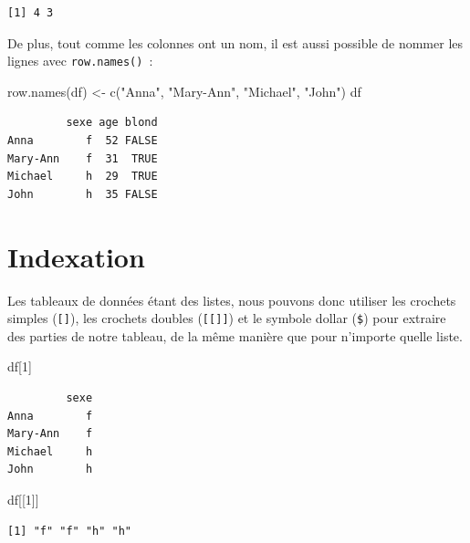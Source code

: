 \documentclass[
  letterpaper,
  DIV=11,
  numbers=noendperiod,
  oneside]{scrreprt}
\newenvironment{Shaded}{\begin{snugshade}}{\end{snugshade}}
\newcommand{\DecValTok}[1]{\textcolor[rgb]{0.68,0.00,0.00}{#1}}
\newcommand{\FunctionTok}[1]{\textcolor[rgb]{0.28,0.35,0.67}{#1}}
\newcommand{\NormalTok}[1]{\textcolor[rgb]{0.00,0.23,0.31}{#1}}
\newcommand{\OtherTok}[1]{\textcolor[rgb]{0.00,0.23,0.31}{#1}}
\newcommand{\StringTok}[1]{\textcolor[rgb]{0.13,0.47,0.30}{#1}}
\begin{document}
\begin{verbatim}
[1] 4 3
\end{verbatim}

De plus, tout comme les colonnes ont un nom, il est aussi possible de
nommer les lignes avec \texttt{row.names()}~:

\begin{Shaded}
\begin{Highlighting}[]
\FunctionTok{row.names}\NormalTok{(df) }\OtherTok{\textless{}{-}} \FunctionTok{c}\NormalTok{(}\StringTok{"Anna"}\NormalTok{, }\StringTok{"Mary{-}Ann"}\NormalTok{, }\StringTok{"Michael"}\NormalTok{, }\StringTok{"John"}\NormalTok{)}
\NormalTok{df}
\end{Highlighting}
\end{Shaded}

\begin{verbatim}
         sexe age blond
Anna        f  52 FALSE
Mary-Ann    f  31  TRUE
Michael     h  29  TRUE
John        h  35 FALSE
\end{verbatim}

\hypertarget{indexation-1}{%
\section{Indexation}\label{indexation-1}}

Les tableaux de données étant des listes, nous pouvons donc utiliser les
crochets simples (\texttt{{[}{]}}), les crochets doubles
(\texttt{{[}{[}{]}{]}}) et le symbole dollar (\texttt{\$}) pour extraire
des parties de notre tableau, de la même manière que pour n'importe
quelle liste.

\begin{Shaded}
\begin{Highlighting}[]
\NormalTok{df[}\DecValTok{1}\NormalTok{]}
\end{Highlighting}
\end{Shaded}

\begin{verbatim}
         sexe
Anna        f
Mary-Ann    f
Michael     h
John        h
\end{verbatim}

\begin{Shaded}
\begin{Highlighting}[]
\NormalTok{df[[}\DecValTok{1}\NormalTok{]]}
\end{Highlighting}
\end{Shaded}

\begin{verbatim}
[1] "f" "f" "h" "h"
\end{verbatim}
\end{document}

